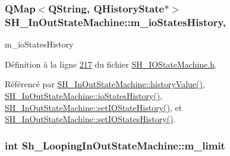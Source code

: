 \hypertarget{classSH__InOutStateMachine_aaca2ea542b3f5b4cd238396b07492455}{
\subsubsection[{m\-\_\-io\-States\-History}]{\setlength{\rightskip}{0pt plus 5cm}Q\-Map$<$Q\-String, Q\-History\-State$\ast$$>$ S\-H\-\_\-\-In\-Out\-State\-Machine\-::m\-\_\-io\-States\-History\hspace{0.3cm}{\ttfamily [protected]}, {\ttfamily [inherited]}}}\label{classSH__InOutStateMachine_aaca2ea542b3f5b4cd238396b07492455}


m\-\_\-io\-States\-History 



Définition à la ligne \hyperlink{SH__IOStateMachine_8h_source_l00217}{217} du fichier \hyperlink{SH__IOStateMachine_8h_source}{S\-H\-\_\-\-I\-O\-State\-Machine.\-h}.



Référencé par \hyperlink{classSH__InOutStateMachine_a84fb2b2c2105cae9c590c0d15960854a}{S\-H\-\_\-\-In\-Out\-State\-Machine\-::history\-Value()}, \hyperlink{classSH__InOutStateMachine_a4ec3ebb4c40ea57c63afdf5976e62a94}{S\-H\-\_\-\-In\-Out\-State\-Machine\-::io\-States\-History()}, \hyperlink{classSH__InOutStateMachine_a4b72e6da839782a211692a4d728c3925}{S\-H\-\_\-\-In\-Out\-State\-Machine\-::set\-I\-O\-State\-History()}, et \hyperlink{classSH__InOutStateMachine_ab35839e7880506286ebb5a11c2a924c2}{S\-H\-\_\-\-In\-Out\-State\-Machine\-::set\-I\-O\-States\-History()}.

\hypertarget{classSh__LoopingInOutStateMachine_a320ece6cf74c2667c70059b9421117fb}{
\subsubsection[{m\-\_\-limit}]{\setlength{\rightskip}{0pt plus 5cm}int Sh\-\_\-\-Looping\-In\-Out\-State\-Machine\-::m\-\_\-limit\hspace{0.3cm}{\ttfamily [private]}}}\label{classSh__LoopingInOutStateMachine_a320ece6cf74c2667c70059b9421117fb}


